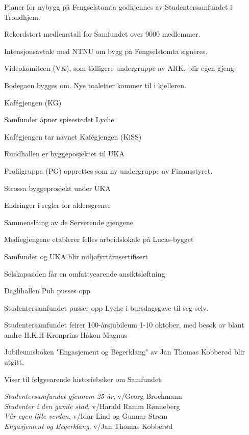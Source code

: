   \item Planer for nybygg på Fengselstomta godkjennes av Studentersamfundet i Trondhjem.
\yearend 

  \item Rekordstort medlemstall for Samfundet over 9000 medlemmer.
  \item Intensjonsavtale med NTNU om bygg på Fengselstomta signeres.
  \item Videokomiteen (VK), som tidligere undergruppe av ARK, blir egen gjeng.
  \item Bodegaen bygges om. Nye toaletter kommer til i kjelleren.
  \item Kafégjengen (KG)
\yearend 

  \item Samfundet åpner spisestedet Lyche.
  \item Kafégjengen tar navnet Kafégjengen (KiSS)
\yearend 

  \item Rundhallen er byggeposjektet til UKA
  \item Profilgruppa (PG) opprettes som ny undergruppe av Finansstyret.
\yearend 

 \item Strossa byggeprosjekt under UKA
 \item Endringer i regler for aldersgrense
 \item Sammenslåing av de Serverende gjengene
 \item Mediegjengene etablerer felles arbeidslokale på Lucas-bygget
 \item Samfundet og UKA blir miljøfyrtårnsertifisert
 \item Selskapssiden får en omfattyearende ansiktsløftning
 \item Daglihallen Pub pusses opp
\yearend 

 \item Studentersamfundet pusser opp Lyche i bursdagsgave til seg selv.
 \item Studentersamfundet feirer 100-årsjubileum 1-10 oktober, med besøk av blant andre H.K.H Kronprins Håkon 
 Magnus
 \item Jubileumsboken "Engasjement og Begerklang" av Jan Thomas Kobberød blir utgitt.
\yearend 

Viser til følgyearende historiebøker om Samfundet:

\textit{Studentersamfundet gjennem 25 år}, v/Georg Brochmann\\
\textit{Studenter i den gamle stad}, v/Harald Ramm Rønneberg\\
\textit{Vår egen lille verden}, v/Idar Lind og Gunnar Strøm\\
\textit{Engasjement og Begerklang}, v/Jan Thomas Kobberød

